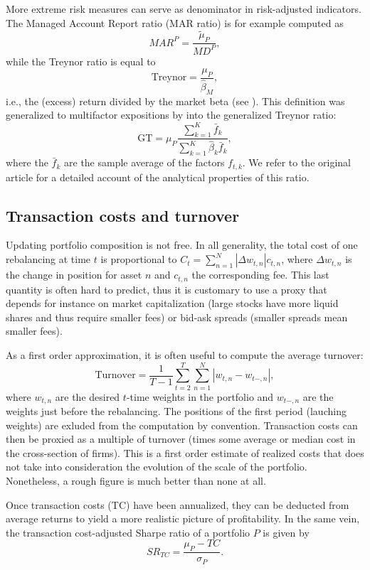 \documentclass[]{krantz}
\theoremstyle{definition}
\theoremstyle{definition}
\theoremstyle{definition}
\theoremstyle{remark}
\begin{document}
More extreme risk measures can serve as denominator in risk-adjusted
indicators. The Managed Account Report ratio (MAR ratio) is for example
computed as \[MAR^P = \frac{\tilde{\mu}_P}{MD^P},\] while the Treynor
ratio is equal to \[\text{Treynor}=\frac{\mu_P}{\hat{\beta}_M},\] i.e.,
the (excess) return divided by the market beta (see
\citet{treynor1965rate}). This definition was generalized to multifactor
expositions by \citet{hubner2005generalized} into the generalized
Treynor ratio:
\[\text{GT}=\mu_P\frac{\sum_{k=1}^K\bar{f}_k}{\sum_{k=1}^K\hat{\beta}_k\bar{f}_k},\]
where the \(\bar{f}_k\) are the sample average of the factors
\(f_{t,k}\). We refer to the original article for a detailed account of
the analytical properties of this ratio.

\hypertarget{transaction-costs-and-turnover}{%
\subsection{Transaction costs and
turnover}\label{transaction-costs-and-turnover}}

Updating portfolio composition is not free. In all generality, the total
cost of one rebalancing at time \(t\) is proportional to
\(C_t=\sum_{n=1}^N | \Delta w_{t,n}|c_{t,n}\), where \(\Delta w_{t,n}\)
is the change in position for asset \(n\) and \(c_{t,n}\) the
corresponding fee. This last quantity is often hard to predict, thus it
is customary to use a proxy that depends for instance on market
capitalization (large stocks have more liquid shares and thus require
smaller fees) or bid-ask spreads (smaller spreads mean smaller fees).

As a first order approximation, it is often useful to compute the
average turnover:
\[\text{Turnover}=\frac{1}{T-1}\sum_{t=2}^T\sum_{n=1}^N|w_{t,n}-w_{t-,n}|,\]
where \(w_{t,n}\) are the desired \(t\)-time weights in the portfolio
and \(w_{t-,n}\) are the weights just before the rebalancing. The
positions of the first period (lauching weights) are exluded from the
computation by convention. Transaction costs can then be proxied as a
multiple of turnover (times some average or median cost in the
cross-section of firms). This is a first order estimate of realized
costs that does not take into consideration the evolution of the scale
of the portfolio. Nonetheless, a rough figure is much better than none
at all.

Once transaction costs (TC) have been annualized, they can be deducted
from average returns to yield a more realistic picture of profitability.
In the same vein, the transaction cost-adjusted Sharpe ratio of a
portfolio \(P\) is given by \begin{equation}
\label{eq:SRTC}
SR_{TC}=\frac{\mu_P-TC}{\sigma_P}.
\end{equation}
\end{document}
